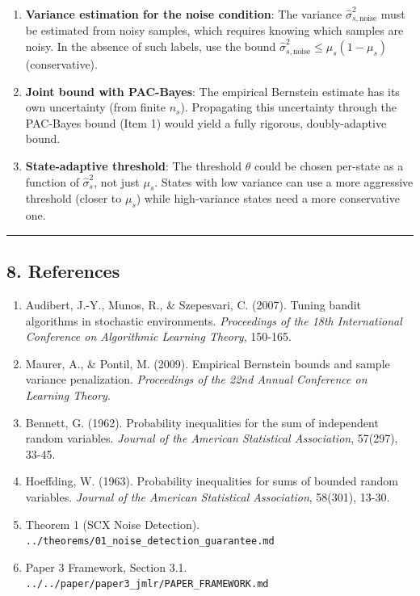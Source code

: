 \documentclass[
  12pt,
]{ctexart}
\begin{document}
\begin{enumerate}
\def\labelenumi{\arabic{enumi}.}
\item
  \textbf{Variance estimation for the noise condition}: The variance
  \(\hat{\sigma}_{s,\text{noise}}^2\) must be estimated from noisy
  samples, which requires knowing which samples are noisy. In the
  absence of such labels, use the bound
  \(\hat{\sigma}_{s,\text{noise}}^2 \leq \mu_s(1-\mu_s)\)
  (conservative).
\item
  \textbf{Joint bound with PAC-Bayes}: The empirical Bernstein estimate
  has its own uncertainty (from finite \(n_s\)). Propagating this
  uncertainty through the PAC-Bayes bound (Item 1) would yield a fully
  rigorous, doubly-adaptive bound.
\item
  \textbf{State-adaptive threshold}: The threshold \(\theta\) could be
  chosen per-state as a function of \(\hat{\sigma}_s^2\), not just
  \(\mu_s\). States with low variance can use a more aggressive
  threshold (closer to \(\mu_s\)) while high-variance states need a more
  conservative one.
\end{enumerate}

\begin{center}\rule{0.5\linewidth}{0.5pt}\end{center}

\subsection{8. References}\label{references}

\begin{enumerate}
\def\labelenumi{\arabic{enumi}.}
\item
  Audibert, J.-Y., Munos, R., \& Szepesvari, C. (2007). Tuning bandit
  algorithms in stochastic environments. \emph{Proceedings of the 18th
  International Conference on Algorithmic Learning Theory}, 150-165.
\item
  Maurer, A., \& Pontil, M. (2009). Empirical Bernstein bounds and
  sample variance penalization. \emph{Proceedings of the 22nd Annual
  Conference on Learning Theory}.
\item
  Bennett, G. (1962). Probability inequalities for the sum of
  independent random variables. \emph{Journal of the American
  Statistical Association}, 57(297), 33-45.
\item
  Hoeffding, W. (1963). Probability inequalities for sums of bounded
  random variables. \emph{Journal of the American Statistical
  Association}, 58(301), 13-30.
\item
  Theorem 1 (SCX Noise Detection).
  \texttt{../theorems/01\_noise\_detection\_guarantee.md}
\item
  Paper 3 Framework, Section 3.1.
  \texttt{../../paper/paper3\_jmlr/PAPER\_FRAMEWORK.md}
\end{enumerate}
\end{document}

